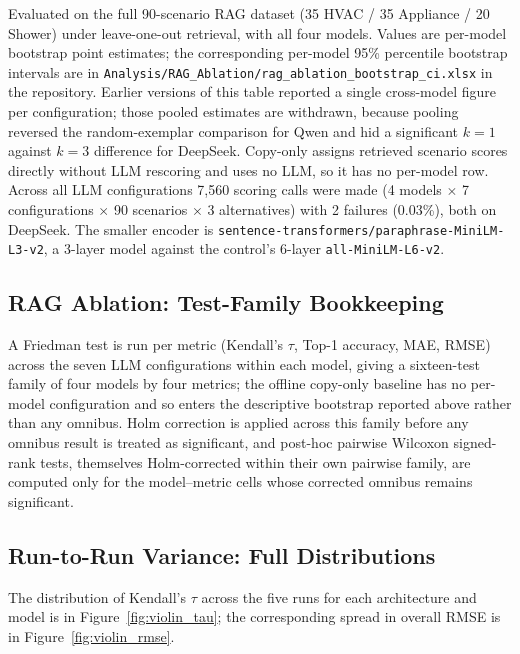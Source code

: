 \documentclass[11pt]{article}
\begin{document}
Evaluated on the full 90-scenario RAG dataset (35 HVAC / 35 Appliance / 20 Shower) under leave-one-out retrieval, with all four models. Values are per-model bootstrap point estimates; the corresponding per-model 95\% percentile bootstrap intervals are in \nolinkurl{Analysis/RAG_Ablation/rag_ablation_bootstrap_ci.xlsx} in the repository. Earlier versions of this table reported a single cross-model figure per configuration; those pooled estimates are withdrawn, because pooling reversed the random-exemplar comparison for Qwen and hid a significant $k{=}1$ against $k{=}3$ difference for DeepSeek. Copy-only assigns retrieved scenario scores directly without LLM rescoring and uses no LLM, so it has no per-model row. Across all LLM configurations 7,560 scoring calls were made (4 models $\times$ 7 configurations $\times$ 90 scenarios $\times$ 3 alternatives) with 2 failures (0.03\%), both on DeepSeek. The smaller encoder is \texttt{sentence-transformers/paraphrase-MiniLM-L3-v2}, a 3-layer model against the control's 6-layer \texttt{all-MiniLM-L6-v2}.

\subsection{RAG Ablation: Test-Family Bookkeeping}
\label{app:rag_ablation_significance}

A Friedman test is run per metric (Kendall's $\tau$, Top-1 accuracy, MAE, RMSE) across the seven LLM configurations within each model, giving a sixteen-test family of four models by four metrics; the offline copy-only baseline has no per-model configuration and so enters the descriptive bootstrap reported above rather than any omnibus. Holm correction is applied across this family before any omnibus result is treated as significant, and post-hoc pairwise Wilcoxon signed-rank tests, themselves Holm-corrected within their own pairwise family, are computed only for the model--metric cells whose corrected omnibus remains significant.

\subsection{Run-to-Run Variance: Full Distributions}
\label{app:variance}

The distribution of Kendall's $\tau$ across the five runs for each architecture and model is in Figure~\ref{fig:violin_tau}; the corresponding spread in overall RMSE is in Figure~\ref{fig:violin_rmse}.
\end{document}

